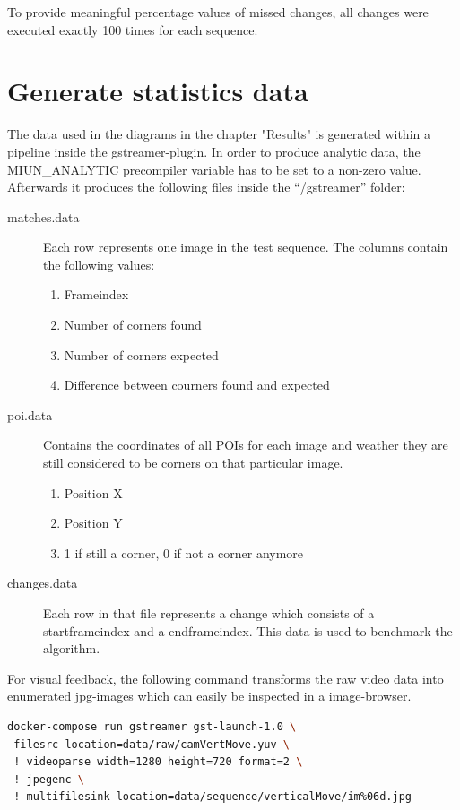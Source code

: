 To provide meaningful percentage values of missed changes, all changes were executed exactly 100 times for each sequence. 
 
 
 \section{Generate statistics data}
 \label{sec:measurement}
 The data used in the diagrams in the chapter "Results" is generated within a pipeline inside the gstreamer-plugin. In order to produce analytic data, the MIUN\_ANALYTIC precompiler variable has to be set to a non-zero value. Afterwards it produces the following files inside the \enquote{/gstreamer} folder:
 \begin{description}
 	\item[matches.data] 
 	Each row represents one image in the test sequence. The columns contain the following values:
 	\begin{enumerate}
 		\item{Frameindex}
 		\item{Number of corners found}
 		\item{Number of corners expected}
 		\item{Difference between courners found and expected}
 	\end{enumerate}
 	\item[poi.data] 
 	Contains the coordinates of all POIs for each image and weather they are still considered to be corners on that particular image.
 	\begin{enumerate}
 		\item{Position X}
 		\item{Position Y}
 		\item{1 if still a corner, 0 if not a corner anymore}
 	\end{enumerate}
 	
 	\item[changes.data] 
 	Each row in that file represents a change which consists of a startframeindex and a endframeindex. This data is used to benchmark the algorithm.
 \end{description}
 \pagebreak
 For visual feedback, the following command transforms the raw video data into enumerated jpg-images which can easily be inspected in a image-browser. 
 
 \begin{lstlisting}[language=bash]
 docker-compose run gstreamer gst-launch-1.0 \
 filesrc location=data/raw/camVertMove.yuv \
 ! videoparse width=1280 height=720 format=2 \
 ! jpegenc \
 ! multifilesink location=data/sequence/verticalMove/im%06d.jpg
 \end{lstlisting}
 
